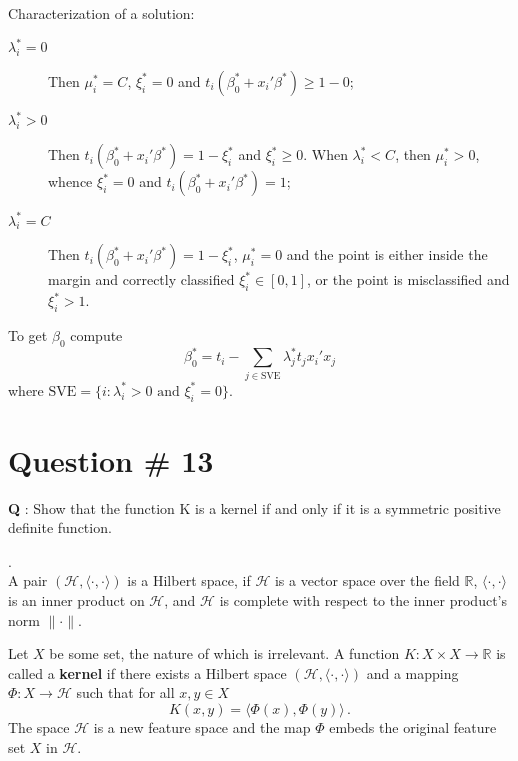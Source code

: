 \documentclass[a4paper]{article}
\newcommand{\Real}{\mathbb{R}}
\newcommand{\Hcal}{\mathcal{H}}
\begin{document}
Characterization of a solution:
\begin{description}
	\item[$\lambda^*_i = 0$] Then $\mu^*_i = C$, $\xi^*_i = 0$ and $t_i ( \beta^*_0 + x_i'\beta^* ) \geq 1 - 0$;
	\item[$\lambda^*_i > 0$] Then $t_i ( \beta^*_0 + x_i'\beta^* ) = 1 - \xi^*_i$ and $\xi^*_i \geq 0$.
		When $\lambda^*_i < C$, then $\mu^*_i > 0$, whence $\xi^*_i = 0$ and $t_i ( \beta^*_0 + x_i'\beta^* ) = 1$;
	\item[$\lambda^*_i = C$] Then $t_i ( \beta^*_0 + x_i'\beta^* ) = 1 - \xi^*_i$,
	$\mu^*_i=0$ and the point is either inside the margin and correctly classified
	$\xi^*_i \in [0,1]$, or the point is misclassified and $\xi^*_i > 1$.
\end{description}
To get $\beta_0$ compute 
\[ \beta^*_0 = t_i - \sum_{j\in\text{SVE}} \lambda^*_j t_j x_i'x_j \]
where $\text{SVE} = \{i: \lambda^*_i > 0 \text{ and } \xi^*_i = 0 \}$.



\clearpage

\section[RKHS]{Question \# 13} %
\label{sec:question_13}
\textbf{\large \textbf{Q}} : Show that the function K is a kernel if and only if
it is a symmetric positive definite function.

 .\hfill\\
A pair $(\Hcal, \langle\cdot,\cdot\rangle)$ is a Hilbert space, if  $\Hcal$ is a
vector space over the field $\Real$, $\langle\cdot,\cdot\rangle$ is an inner product
on $\Hcal$, and $\Hcal$ is complete with respect to the inner product's norm $\|\cdot\|$.

Let $X$ be some set, the nature of which is irrelevant. A function $K:X\times X\to \Real$
is called a \textbf{kernel} if there exists a Hilbert space $(\Hcal, \langle\cdot,\cdot\rangle)$
and a mapping $\Phi : X \to \Hcal$ such that for all $x,y\in X$
\[ K(x,y) = \bigl\langle \Phi(x), \Phi(y) \bigr\rangle \,. \]
The space $\Hcal$ is a new feature space and the map $\Phi$ embeds the original
feature set $X$ in $\Hcal$.
\end{document}
